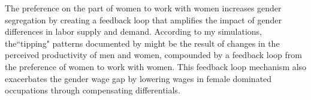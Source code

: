 \documentclass[11pt]{article}
\begin{document}


The preference on the part of women to work with women increases gender segregation by creating a feedback loop that amplifies the impact of gender differences in labor supply and demand. According to my simulations, the``tipping" patterns documented by  might be the result of changes in the perceived productivity of men and women, compounded by a feedback loop from the preference of women to work with women. This feedback loop mechanism also exacerbates the gender wage gap by lowering wages in female dominated occupations through compensating differentials.




\end{document}
